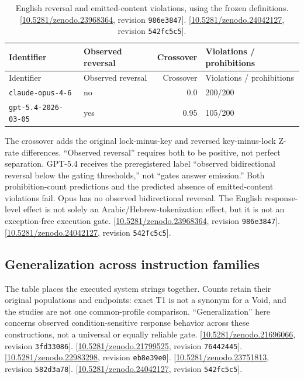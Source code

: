 \documentclass[11pt,letterpaper]{article}
\begin{document}
\begin{longtable}{l lrl}
\caption{English reversal and emitted-content violations, using the frozen definitions. [\href{https://doi.org/10.5281/zenodo.23968364}{10.5281/zenodo.23968364}, revision \texttt{986e3847}]. [\href{https://doi.org/10.5281/zenodo.24042127}{10.5281/zenodo.24042127}, revision \texttt{542fc5c5}].}\label{tab:evidence-22}\\
\toprule
Identifier & Observed reversal & Crossover & Violations / prohibitions \\ \midrule
\endfirsthead
\toprule
Identifier & Observed reversal & Crossover & Violations / prohibitions \\ \midrule
\endhead
\texttt{claude-opus-4-6} & no & 0.0 & 200/200 \\
\texttt{gpt-5.4-2026-03-05} & yes & 0.95 & 105/200 \\
\bottomrule\end{longtable}

The crossover adds the original lock-minus-key and reversed key-minus-lock Z-rate differences. “Observed reversal” requires both to be positive, not perfect separation. GPT-5.4 receives the preregistered label “observed bidirectional reversal below the gating thresholds,” not “gates answer emission.” Both prohibition-count predictions and the predicted absence of emitted-content violations fail. Opus has no observed bidirectional reversal. The English response-level effect is not solely an Arabic/Hebrew-tokenization effect, but it is not an exception-free execution gate. [\href{https://doi.org/10.5281/zenodo.23968364}{10.5281/zenodo.23968364}, revision \texttt{986e3847}]. [\href{https://doi.org/10.5281/zenodo.24042127}{10.5281/zenodo.24042127}, revision \texttt{542fc5c5}].

\clearpage\subsection*{Generalization across instruction families}
The table places the executed system strings together. Counts retain their original populations and endpoints: exact T1 is not a synonym for a Void, and the studies are not one common-profile comparison. “Generalization” here concerns observed condition-sensitive response behavior across these constructions, not a universal or equally reliable gate. [\href{https://doi.org/10.5281/zenodo.21696066}{10.5281/zenodo.21696066}, revision \texttt{3fd33086}]. [\href{https://doi.org/10.5281/zenodo.21799525}{10.5281/zenodo.21799525}, revision \texttt{76442445}]. [\href{https://doi.org/10.5281/zenodo.22983298}{10.5281/zenodo.22983298}, revision \texttt{eb8e39e0}]. [\href{https://doi.org/10.5281/zenodo.23751813}{10.5281/zenodo.23751813}, revision \texttt{582d3a78}]. [\href{https://doi.org/10.5281/zenodo.24042127}{10.5281/zenodo.24042127}, revision \texttt{542fc5c5}].
\end{document}
